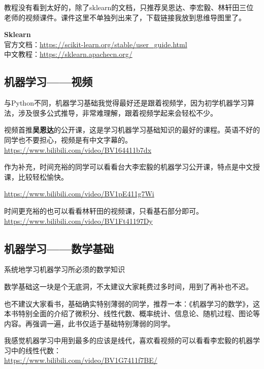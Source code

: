 \documentclass[]{ctexbook}
\begin{document}
教程没有看到太好的，除了sklearn的文档，只推荐吴恩达、李宏毅、林轩田三位老师的视频课件。课件这里不单独列出来了，下载链接我放到思维导图里了。

\textbf{Sklearn}\\
官方文档：\url{https://scikit-learn.org/stable/user_guide.html}\\
中文教程：\url{https://sklearn.apachecn.org/}

\hypertarget{ux673aux5668ux5b66ux4e60ux89c6ux9891}{%
\subsection{机器学习------视频}\label{ux673aux5668ux5b66ux4e60ux89c6ux9891}}

与Python不同，机器学习基础我觉得最好还是跟着视频学，因为初学机器学习算法，涉及很多公式推导，非常难理解，跟着视频学起来会轻松不少。

视频首推\textbf{吴恩达}的公开课，这是学习机器学习基础知识的最好的课程。英语不好的同学也不要担心，视频是有中文字幕的。\\
\url{https://www.bilibili.com/video/BV164411b7dx}

作为补充，时间充裕的同学可以看看台大李宏毅的机器学习公开课，特点是中文授课，比较轻松愉快。

\url{https://www.bilibili.com/video/BV1pE411g7Wi}

时间更充裕的也可以看看林轩田的视频课，只看基石部分即可。\\
\url{https://www.bilibili.com/video/BV1Ft41197Dy}

\hypertarget{ux673aux5668ux5b66ux4e60ux6570ux5b66ux57faux7840}{%
\subsection{机器学习------数学基础}\label{ux673aux5668ux5b66ux4e60ux6570ux5b66ux57faux7840}}

系统地学习机器学习所必须的数学知识

数学基础这一块是个无底洞，不太建议大家耗费过多时间，用到了再补也不迟。

也不建议大家看书，基础确实特别薄弱的同学，推荐一本：《机器学习的数学》，这本书特别全面的介绍了微积分、线性代数、概率统计、信息论、随机过程、图论等内容。再强调一遍，此书仅适于基础特别薄弱的同学。

我感觉机器学习中用到最多的应该是线代，喜欢看视频的可以看看李宏毅的机器学习中的线性代数：\\
\url{https://www.bilibili.com/video/BV1G7411f7BE/}
\end{document}
